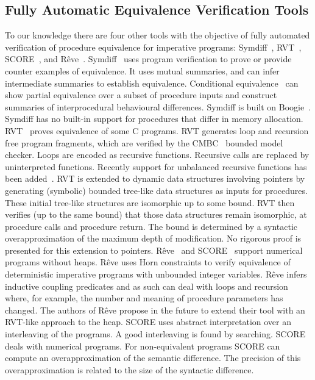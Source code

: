 \documentclass[runningheads,a4paper]{llncs}
\begin{document}
\subsection{Fully Automatic Equivalence Verification Tools}
To our knowledge there are four other tools with the objective of fully automated verification of procedure equivalence for imperative programs: Symdiff~\cite{Lahiri2012}, RVT~\cite{Godlin09}, SCORE~\cite{Partush2014}, and R{\^e}ve~\cite{Felsing2014}.
Symdiff~\cite{Lahiri2012} uses program verification to prove or provide counter examples of equivalence. It uses mutual summaries, and can infer intermediate summaries to establish equivalence. Conditional equivalence~\cite{Hawblitzel2013} can show partial equivalence over a subset of procedure inputs and construct summaries of interprocedural behavioural differences. Symdiff is built on Boogie~\cite{Barnett2005}. Symdiff has no 
built-in support for procedures that differ in memory allocation.
RVT~\cite{Godlin09} proves equivalence of some C programs. RVT generates loop and recursion free program fragments, which are verified by the CMBC~\cite{Clarke2003} bounded model checker. Loops are encoded as recursive functions. Recursive calls are replaced by uninterpreted functions. Recently support for unbalanced recursive functions has been added~\cite{Strichman2016}. RVT is extended to dynamic data structures involving pointers by generating (symbolic) bounded tree-like data structures as inputs for procedures. These initial tree-like structures are isomorphic up to some bound. RVT then verifies (up to the same bound) that those data structures remain isomorphic, at procedure calls and procedure return. The bound is determined by a syntactic overapproximation of the maximum depth of modification. No rigorous proof is presented for this extension to pointers.
R{\^e}ve~\cite{Felsing2014} and SCORE~\cite{Partush2014} support numerical programs without heaps. R{\^e}ve uses Horn constraints to verify equivalence of deterministic imperative programs with unbounded integer variables. R{\^e}ve infers inductive coupling predicates and as such can deal with loops and recursion where, for example, the number and meaning of procedure parameters has changed. The authors of R{\^e}ve propose in the future to extend their tool with an RVT-like approach to the heap. SCORE uses abstract interpretation over an interleaving of the programs. A good interleaving is found by searching. SCORE deals with numerical programs. For non-equivalent programs SCORE can compute an overapproximation of the semantic difference. The precision of this overapproximation is related to the size of the syntactic difference.
\end{document}
